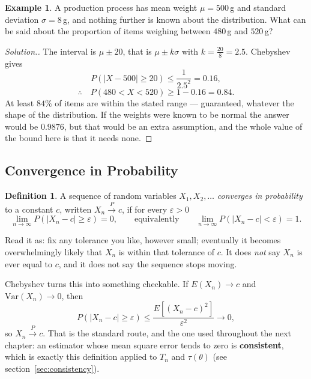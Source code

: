 \documentclass[12pt,a4paper]{report}
\theoremstyle{definition}
\newtheorem{definition}[thm]{Definition}
\newtheorem{example}[thm]{Example}
\theoremstyle{plain}
\newenvironment{solution}
  {\renewcommand{\qedsymbol}{}\begin{proof}[\textit{Solution}.]}
  {\end{proof}}
\begin{document}
\begin{example}
A production process has mean weight $\mu=500$\,g and standard deviation
$\sigma=8$\,g, and nothing further is known about the distribution. What can be
said about the proportion of items weighing between $480$\,g and $520$\,g?
\end{example}

\begin{solution}
The interval is $\mu\pm20$, that is $\mu\pm k\sigma$ with
$k=\frac{20}{8}=2.5$. Chebyshev gives
\[P\left(\left|X-500\right|\geq20\right)\leq\frac{1}{2.5^2}=0.16,\]
\[\therefore\quad P\left(480<X<520\right)\geq1-0.16=0.84.\]
At least $84\%$ of items are within the stated range --- guaranteed, whatever the
shape of the distribution. If the weights were known to be normal the answer would
be $0.9876$, but that would be an extra assumption, and the whole value of the
bound here is that it needs none.
\end{solution}

\subsection{Convergence in Probability}

\begin{definition}
A sequence of random variables $X_1,X_2,\ldots$ \emph{converges in probability} to
a constant $c$, written $X_n\overset{P}{\longrightarrow}c$, if for every
$\varepsilon>0$
\[\lim_{n\to\infty}P\left(\left|X_n-c\right|\geq\varepsilon\right)=0,
\qquad\text{equivalently}\qquad
\lim_{n\to\infty}P\left(\left|X_n-c\right|<\varepsilon\right)=1.\]
\end{definition}

Read it as: fix any tolerance you like, however small; eventually it becomes
overwhelmingly likely that $X_n$ is within that tolerance of $c$. It does
\emph{not} say $X_n$ is ever equal to $c$, and it does not say the sequence stops
moving.

Chebyshev turns this into something checkable. If $E(X_n)\to c$ and
$\text{Var}(X_n)\to0$, then
\[P\left(\left|X_n-c\right|\geq\varepsilon\right)
\leq\frac{E\left[(X_n-c)^2\right]}{\varepsilon^2}\longrightarrow0,\]
so $X_n\overset{P}{\longrightarrow}c$. That is the standard route, and the one
used throughout the next chapter: an estimator whose mean square error tends to
zero is \textbf{consistent}, which is exactly this definition applied to
$T_n$ and $\tau(\theta)$ (see section~\ref{sec:consistency}).
\end{document}

